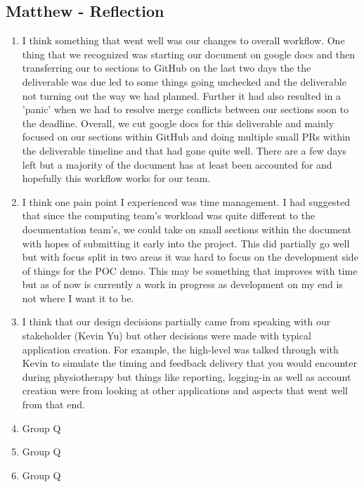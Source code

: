 \documentclass[12pt, titlepage]{article}
\begin{document}
\subsection*{Matthew - Reflection}
\begin{enumerate}
  \item I think something that went well was our changes to overall workflow. One thing that we recognized was starting our document on google docs and then transferring our to sections to GitHub on the last two days the the deliverable was due led to some things going unchecked and the deliverable not turning out the way we had planned. Further it had also resulted in a 'panic' when we had to resolve merge conflicts between our sections soon to the deadline. Overall, we cut google docs for this deliverable and mainly focused on our sections within GitHub and doing multiple small PRs within the deliverable timeline and that had gone quite well. There are a few days left but a majority of the document has at least been accounted for and hopefully this workflow works for our team.
  \item I think one pain point I experienced was time management. I had suggested that since the computing team's workload was quite different to the documentation team's, we could take on small sections within the document with hopes of submitting it early into the project. This did partially go well but with focus split in two areas it was hard to focus on the development side of things for the POC demo. This may be something that improves with time but as of now is currently a work in progress as development on my end is not where I want it to be.
  \item I think that our design decisions partially came from speaking with our stakeholder (Kevin Yu) but other decisions were made with typical application creation. For example, the high-level was talked through with Kevin to simulate the timing and feedback delivery that you would encounter during physiotherapy but things like reporting, logging-in as well as account creation were from looking at other applications and aspects that went well from that end. 
  \item Group Q
  \item Group Q
  \item Group Q
  

\end{enumerate}
\end{document}
